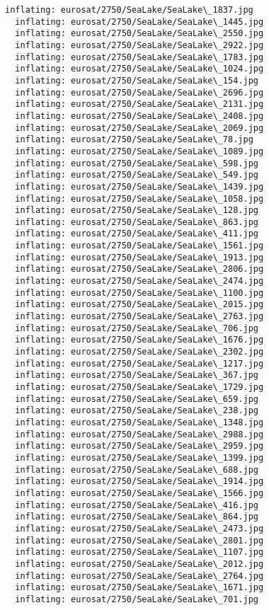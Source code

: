 \documentclass[11pt]{article}
\begin{document}
\begin{Verbatim}[commandchars=\\\{\}]
  inflating: eurosat/2750/SeaLake/SeaLake\_1837.jpg
  inflating: eurosat/2750/SeaLake/SeaLake\_1445.jpg
  inflating: eurosat/2750/SeaLake/SeaLake\_2550.jpg
  inflating: eurosat/2750/SeaLake/SeaLake\_2922.jpg
  inflating: eurosat/2750/SeaLake/SeaLake\_1783.jpg
  inflating: eurosat/2750/SeaLake/SeaLake\_1024.jpg
  inflating: eurosat/2750/SeaLake/SeaLake\_154.jpg
  inflating: eurosat/2750/SeaLake/SeaLake\_2696.jpg
  inflating: eurosat/2750/SeaLake/SeaLake\_2131.jpg
  inflating: eurosat/2750/SeaLake/SeaLake\_2408.jpg
  inflating: eurosat/2750/SeaLake/SeaLake\_2069.jpg
  inflating: eurosat/2750/SeaLake/SeaLake\_78.jpg
  inflating: eurosat/2750/SeaLake/SeaLake\_1089.jpg
  inflating: eurosat/2750/SeaLake/SeaLake\_598.jpg
  inflating: eurosat/2750/SeaLake/SeaLake\_549.jpg
  inflating: eurosat/2750/SeaLake/SeaLake\_1439.jpg
  inflating: eurosat/2750/SeaLake/SeaLake\_1058.jpg
  inflating: eurosat/2750/SeaLake/SeaLake\_128.jpg
  inflating: eurosat/2750/SeaLake/SeaLake\_863.jpg
  inflating: eurosat/2750/SeaLake/SeaLake\_411.jpg
  inflating: eurosat/2750/SeaLake/SeaLake\_1561.jpg
  inflating: eurosat/2750/SeaLake/SeaLake\_1913.jpg
  inflating: eurosat/2750/SeaLake/SeaLake\_2806.jpg
  inflating: eurosat/2750/SeaLake/SeaLake\_2474.jpg
  inflating: eurosat/2750/SeaLake/SeaLake\_1100.jpg
  inflating: eurosat/2750/SeaLake/SeaLake\_2015.jpg
  inflating: eurosat/2750/SeaLake/SeaLake\_2763.jpg
  inflating: eurosat/2750/SeaLake/SeaLake\_706.jpg
  inflating: eurosat/2750/SeaLake/SeaLake\_1676.jpg
  inflating: eurosat/2750/SeaLake/SeaLake\_2302.jpg
  inflating: eurosat/2750/SeaLake/SeaLake\_1217.jpg
  inflating: eurosat/2750/SeaLake/SeaLake\_367.jpg
  inflating: eurosat/2750/SeaLake/SeaLake\_1729.jpg
  inflating: eurosat/2750/SeaLake/SeaLake\_659.jpg
  inflating: eurosat/2750/SeaLake/SeaLake\_238.jpg
  inflating: eurosat/2750/SeaLake/SeaLake\_1348.jpg
  inflating: eurosat/2750/SeaLake/SeaLake\_2988.jpg
  inflating: eurosat/2750/SeaLake/SeaLake\_2959.jpg
  inflating: eurosat/2750/SeaLake/SeaLake\_1399.jpg
  inflating: eurosat/2750/SeaLake/SeaLake\_688.jpg
  inflating: eurosat/2750/SeaLake/SeaLake\_1914.jpg
  inflating: eurosat/2750/SeaLake/SeaLake\_1566.jpg
  inflating: eurosat/2750/SeaLake/SeaLake\_416.jpg
  inflating: eurosat/2750/SeaLake/SeaLake\_864.jpg
  inflating: eurosat/2750/SeaLake/SeaLake\_2473.jpg
  inflating: eurosat/2750/SeaLake/SeaLake\_2801.jpg
  inflating: eurosat/2750/SeaLake/SeaLake\_1107.jpg
  inflating: eurosat/2750/SeaLake/SeaLake\_2012.jpg
  inflating: eurosat/2750/SeaLake/SeaLake\_2764.jpg
  inflating: eurosat/2750/SeaLake/SeaLake\_1671.jpg
  inflating: eurosat/2750/SeaLake/SeaLake\_701.jpg

\end{Verbatim}
\end{document}
